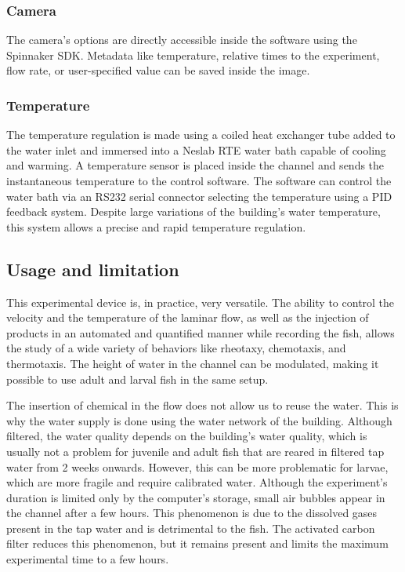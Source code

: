   \subsubsection{Camera}
  The camera's options are directly accessible inside the software using the Spinnaker SDK. Metadata like temperature, relative times to the experiment, flow rate, or user-specified value can be saved inside the image.

  \subsubsection{Temperature}
  The temperature regulation is made using a coiled heat exchanger tube added to the water inlet and immersed into a Neslab RTE water bath capable of cooling and warming. A temperature sensor is placed inside the channel and sends the instantaneous temperature to the control software. The software can control the water bath via an RS232 serial connector selecting the temperature using a PID feedback system. Despite large variations of the building's water temperature, this system allows a precise and rapid temperature regulation.

  \subsection{Usage and limitation}
  This experimental device is, in practice, very versatile. The ability to control the velocity and the temperature of the laminar flow, as well as the injection of products in an automated and quantified manner while recording the fish, allows the study of a wide variety of behaviors like rheotaxy, chemotaxis, and thermotaxis. The height of water in the channel can be modulated, making it possible to use adult and larval fish in the same setup.

  The insertion of chemical in the flow does not allow us to reuse the water. This is why the water supply is done using the water network of the building. Although filtered, the water quality depends on the building's water quality, which is usually not a problem for juvenile and adult fish that are reared in filtered tap water from 2 weeks onwards. However, this can be more problematic for larvae, which are more fragile and require calibrated water. Although the experiment's duration is limited only by the computer's storage, small air bubbles appear in the channel after a few hours. This phenomenon is due to the dissolved gases present in the tap water and is detrimental to the fish. The activated carbon filter reduces this phenomenon, but it remains present and limits the maximum experimental time to a few hours.

